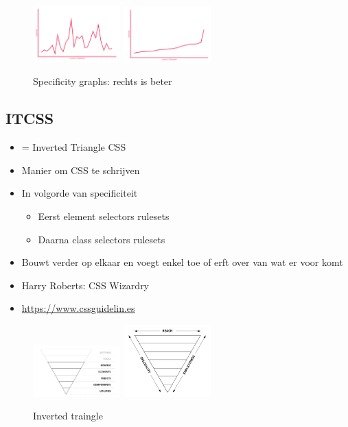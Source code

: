 \documentclass{article}
\begin{document}
\begin{figure}[H]
    \centering
    \includegraphics[width=0.3\textwidth]{img/Screenshot_20200309_101014.png}
    \includegraphics[width=0.3\textwidth]{img/Screenshot_20200309_101053.png}
    \caption{Specificity graphs: rechts is beter}
\end{figure}


\subsection{ITCSS}
\begin{itemize}
    \item = Inverted Triangle CSS
    \item Manier om CSS te schrijven
    \item In volgorde van specificiteit
    \begin{itemize}
        \item Eerst element selectors rulesets
        \item Daarna class selectors rulesets
    \end{itemize}
    \item Bouwt verder op elkaar en voegt enkel toe of erft over van wat er voor komt
    \item Harry Roberts: CSS Wizardry
    \item \url{https://www.cssguidelin.es}
\end{itemize}

\begin{figure}[H]
    \centering
    \includegraphics[width=0.3\textwidth]{img/Screenshot_20200309_101408.png}
    \includegraphics[width=0.3\textwidth]{img/Screenshot_20200309_101427.png}
    \caption{Inverted traingle}
\end{figure}
\end{document}
